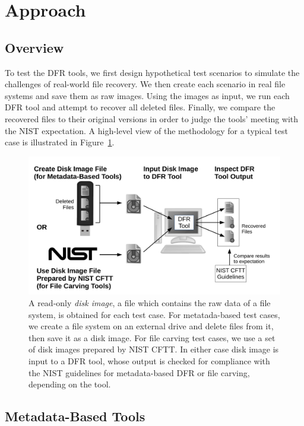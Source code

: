 \section{Approach}
\subsection{Overview}
\begin{paraphrase}
 To test the DFR tools, we first design hypothetical test scenarios to simulate the challenges of real-world file recovery.
We then create each scenario in real file systems and save them as raw images. 
Using the images as input, we run each DFR tool and attempt to recover all deleted files. 
Finally, we compare the recovered files to their original versions in order to judge the tools' 
meeting with the NIST expectation. A high-level view of the methodology for a typical test case is illustrated in Figure~\ref{fig:overview}.

\begin{figure}[h]
    \centering
    \includegraphics[width=\linewidth]{fig/overview.pdf}
    \caption{
        A read-only \emph{disk image}, a file which contains the raw data of a file system, is obtained for each test case.
        For metatada-based test cases, we create a file system on an external drive and delete files from it, then save it as a disk image.
        For file carving test cases, we use a set of disk images prepared by NIST CFTT.
        In either case disk image is input to a DFR tool, whose output is checked for compliance with the NIST guidelines for metadata-based DFR or file carving, depending on the tool.
    }
    \label{fig:overview}
\end{figure}
\end{paraphrase}


\subsection{Metadata-Based Tools}
